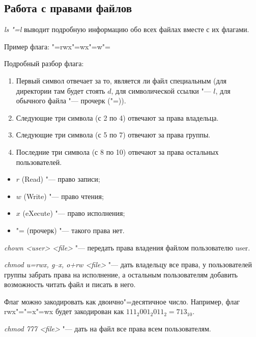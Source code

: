 \subsection{Работа с правами файлов}

\textit{ls "=l} выводит подробную информацию обо всех файлах вместе с их флагами.

Пример флага: "=rwx"=wx"=w"=

Подробный разбор флага:
\begin{enumerate}
	\item Первый символ отвечает за то, является ли файл специальным (для директории там будет стоять $d$, для символической ссылки "--- $l$, для обычного файла "--- прочерк ("=)).
	\item Следующие три символа (с 2 по 4) отвечают за права владельца.
	\item Следующие три символа (с 5 по 7) отвечают за права группы.
	\item Последние три символа (с 8 по 10) отвечают за права остальных пользователей.
\end{enumerate}

\begin{itemize}
	\item $r$ (Read) "--- право записи;
	\item $w$ (Write) "--- право чтения;
	\item $x$ (eXecute) "--- право исполнения;
	\item "= (прочерк) "--- такого права нет.
\end{itemize}

\textit{chown <user> <file>} "--- передать права владения файлом пользователю user.

\textit{chmod u=rwx, g--x, o+rw <file>} "--- дать владельцу все права, у пользователей группы забрать права на исполнение, а остальным пользователям добавить возможность читать файл и писать в него.

Флаг можно закодировать как двоично"=десятичное число. Например, флаг rwx"="=x"=wx будет закодирован как $111_2 001_2 011_2 = 713_{10}$.

\textit{chmod 777 <file>} "--- дать на файл все права всем пользователям.
